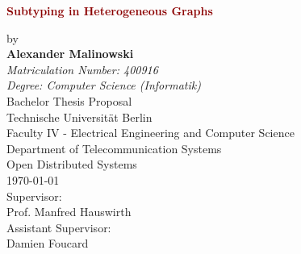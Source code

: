 \begin{titlepage}
\begin{figure}[H]
  \centering
  \vspace*{-1.22cm}
  \hfill
\end{figure}
	\begin{center}
	\vspace{1cm}
		\Huge
		\begin{spacing}{.9}
			\textcolor{DarkRed}{\textbf{Subtyping in Heterogeneous Graphs}}\\
		\end{spacing}
		\vspace{0.8cm}
		\large
		by\\
		\vspace{0.8cm} 
		\textbf{Alexander Malinowski}\\
		\vspace{0.8cm} 
		\emph{Matriculation Number: 400916}\\
		\emph{{Degree:} Computer Science (Informatik)}\\
		\vspace{1cm} 
	 	Bachelor Thesis Proposal\\
		\vspace{0.5cm}
		Technische Universität Berlin\\
		Faculty IV - Electrical Engineering and Computer Science\\
		Department of Telecommunication Systems\\
		Open Distributed Systems\\
		\vspace{1.0cm}
		\today\\
		\vspace{1.0cm}
		\large
		Supervisor:\\
		Prof. Manfred Hauswirth\\
		\vspace{1cm}
		Assistant Supervisor:\\
		Damien Foucard
		\end{center}
\end{titlepage}
